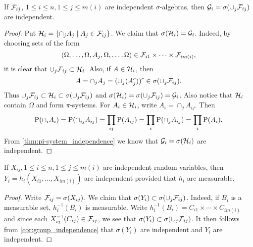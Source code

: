 \begin{corollary}\label{cor:group_independence}
    If $\F_{ij}$, $1\leq i\leq n, 1\leq j\leq m(i)$ are independent $\sigma$-algebras, 
    then $\G_i = \sigma(\cup_j \F_{ij})$ are independent. 
\end{corollary}
\begin{proof}
    Put $\H_i = \Set{\cap_j A_j}{A_j\in\F_{{ij}}}$. We claim that $\sigma(\H_i) = \G_i$. 
    Indeed, by choosing sets of the form 
    \begin{equation*}
        (\Omega,\ldots,\Omega,A_j,\Omega,\ldots,\Omega)\in\F_{i1}\times\cdots\times\F_{im(i)}, 
    \end{equation*}
    it is clear that $\cup_j\F_{ij} \subset \H_i$. Also, if $A\in\H_i$, then 
    \begin{equation*}
        A = \cap_j A_j = (\cup_j(A_j^c))^c \in\sigma(\cup_j\F_{ij}). 
    \end{equation*}
    Thus $\cup_j \F_{ij}\subset\H_i\subset\sigma(\cup_j \F_{ij})$ and 
    $\sigma(\H_i) = \sigma(\cup_j \F_{ij}) = \G_i$. Also notice that $\H_i$ 
    contain $\Omega$ and form $\pi$-systems. For $A_i\in\H_i$, write $A_i = \cap_j A_{ij}$. 
    Then 
    \begin{equation*}
        \P(\cap_i A_i) = \P(\cap_{ij}A_{ij}) = \prod_{ij}\P(A_{ij}) = \prod_i\P(\cap_j A_{ij}) 
        = \prod_i \P(A_i).
    \end{equation*}
    From \cref{thm:pi-system_independence} we know that $\G_i = \sigma(\H_i)$ are 
    independent. 
\end{proof}

\begin{corollary}
    If $X_{ij}, 1\leq i\leq n, 1\leq j\leq m(i)$ are independent random variables, then 
    $Y_i = h_i(X_{i1},\ldots,X_{im(i)})$ are independent provided that $h_i$ are measurable. 
\end{corollary}
\begin{proof}
    Write $\F_{ij} = \sigma(X_{ij})$. We claim that $\sigma(Y_i) \subset \sigma(\cup_j \F_{ij})$. 
    Indeed, if $B_i$ is a measurable set, $h_i^{-1}(B_i)$ is measurable. Write 
    $h_i^{-1}(B_i) = C_{i1}\times\cdots\times C_{im(i)}$ and since each 
    $X_{ij}^{-1}(C_{ij})\in\F_{ij}$, we see that $\sigma(Y_i)\subset\sigma(\cup_{j}\F_{ij})$. 
    It then follows from \cref{cor:group_independence} that $\sigma(Y_i)$ are independent 
    and $Y_i$ are independent. 
\end{proof}

